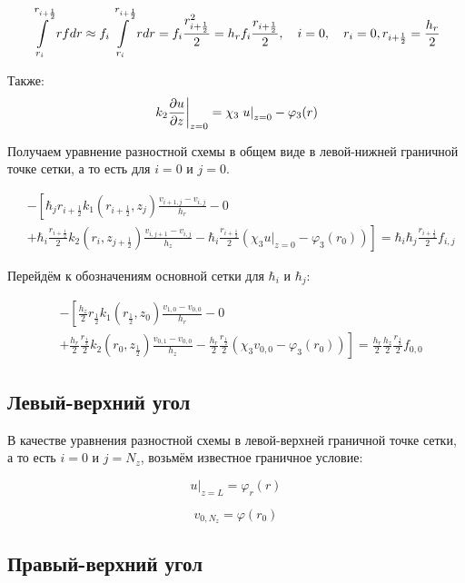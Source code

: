 \[
  \int\limits^{r_{i+ \frac{1}{2}}}_{r_{i}} rf dr \approx f_i \int\limits^{r_{i + \frac{1}{2}}}_{r_{i}} r dr = 
  f_i \frac{r^2_{i + \frac{1}{2}}}{2} = h_r f_i \frac{r_{i + \frac{1}{2}}}{2},
  \quad i = 0, \quad r_i = 0, r_{i + \frac{1}{2}} = \frac{h_r}{2}
\]

Также:
\[
  \left . k_2 \pdv{u}{z} \right \vert_{z=0} = \chi_3 \left . u \right \vert_{z=0} - \varphi_3(r) 
\]

Получаем уравнение разностной схемы в общем виде в левой-нижней граничной точке сетки, а то есть
для $ i = 0 $ и $ j = 0 $.

\begin{align*}
  &- \left [ 
  \hbar_j r_{i+\frac{1}{2}} k_1(r_{i+\frac{1}{2}}, z_j) \frac{v_{i+1, j} - v_{i, j}}{h_{r}}
  - 0
  \right . \\
  &\left .
  + \hbar_i \frac{r_{i + \frac{1}{2}}}{2} k_2(r_i, z_{j+\frac{1}{2}}) \frac{v_{i, j + 1} - v_{i, j}}{h_{z}}
  - \hbar_i \frac{r_{i + \frac{1}{2}}}{2} (\chi_3 \left . u \right \vert_{z=0} - \varphi_3(r_0))
  \right ]  = \hbar_i \hbar_j \frac{r_{i + \frac{1}{2}}}{2} f_{i, j}
\end{align*}

Перейдём к обозначениям основной сетки для $ \hbar_i $ и $ \hbar_j $:

\begin{align*}
  &- \left [ 
  \frac{h_z}{2} r_{\frac{1}{2}} k_1(r_{\frac{1}{2}}, z_0) \frac{v_{1, 0} - v_{0, 0}}{h_{r}}
  - 0
  \right . \\
  &\left .
  + \frac{h_r}{2} \frac{r_{\frac{1}{2}}}{2} k_2(r_0, z_{\frac{1}{2}}) \frac{v_{0, 1} - v_{0, 0}}{h_{z}}
  - \frac{h_r}{2} \frac{r_{\frac{1}{2}}}{2} (\chi_3 v_{0, 0} - \varphi_3(r_0))
  \right ]  = \frac{h_r}{2} \frac{h_z}{2} \frac{r_{\frac{1}{2}}}{2} f_{0, 0}
\end{align*}

\subsection{Левый-верхний угол}

В качестве уравнения разностной схемы в левой-верхней граничной точке сетки, 
а то есть $ i = 0 $ и $ j = N_z $, возьмём известное граничное условие:

\[
  \left . u \right \vert_{z=L} = \varphi_r(r) 
\]

\[
  v_{0,N_z} = \varphi(r_0)
\]

\subsection{Правый-верхний угол}

